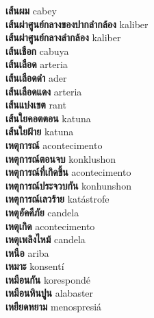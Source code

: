\textbf{ เส้นผม  } cabey \\
\textbf{ เส้นผ่าศูนย์กลางของปากลำกล้อง  } kaliber \\
\textbf{ เส้นผ่าศูนย์กลางลำกล้อง  } kaliber \\
\textbf{ เส้นเชือก  } cabuya \\
\textbf{ เส้นเลือด  } arteria \\
\textbf{ เส้นเลือดดำ  } ader \\
\textbf{ เส้นเลือดแดง  } arteria \\
\textbf{ เส้นแบ่งเขต  } rant \\
\textbf{ เส้นใยคอตตอน  } katuna \\
\textbf{ เส้นใยฝ้าย  } katuna \\
\textbf{ เหตุการณ์  } acontecimento \\
\textbf{ เหตุการณ์ตอนจบ  } konklushon \\
\textbf{ เหตุการณ์ที่เกิดขึ้น  } acontecimento \\
\textbf{ เหตุการณ์ประจวบกัน  } konhunshon \\
\textbf{ เหตุการณ์เลวร้าย  } katástrofe \\
\textbf{ เหตุอัคคีภัย  } candela \\
\textbf{ เหตุเกิด  } acontecimento \\
\textbf{ เหตุเพลิงไหม้  } candela \\
\textbf{ เหนือ  } ariba \\
\textbf{ เหมาะ  } konsentí \\
\textbf{ เหมือนกัน  } korespondé \\
\textbf{ เหมือนหินปูน  } alabaster \\
\textbf{ เหยียดหยาม  } menospresiá \\
